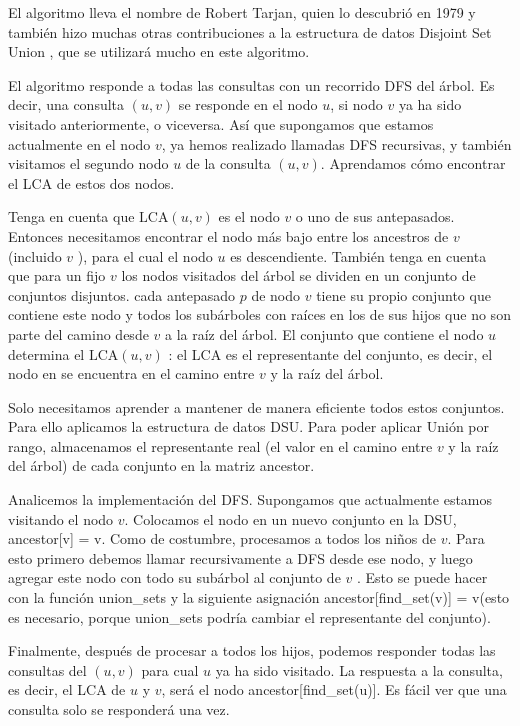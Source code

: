 El algoritmo lleva el nombre de Robert Tarjan, quien lo descubrió en 1979 y también hizo muchas otras contribuciones a la estructura de datos Disjoint Set Union , que se utilizará mucho en este algoritmo. 

El algoritmo responde a todas las consultas con un recorrido DFS del árbol. Es decir, una consulta $(u,v)$ se responde en el nodo $u$, si nodo $v$ ya ha sido visitado anteriormente, o viceversa. Así que supongamos 
que estamos actualmente en el nodo $v$, ya hemos realizado llamadas DFS recursivas, y también visitamos el 
segundo nodo $u$ de la consulta $(u,v)$. Aprendamos cómo encontrar el LCA de estos dos nodos.

Tenga en cuenta que $\text{LCA}(u, v)$ es el nodo $v$ o uno de sus antepasados. Entonces necesitamos 
encontrar el nodo más bajo entre los ancestros de $v$ (incluido $v$ ), para el cual el nodo $u$ es 
descendiente. También tenga en cuenta que para un fijo $v$ los nodos visitados del árbol se dividen en un 
conjunto de conjuntos disjuntos. cada antepasado $p$ de nodo $v$ tiene su propio conjunto que contiene este 
nodo y todos los subárboles con raíces en los de sus hijos que no son parte del camino desde $v$ a la raíz 
del árbol. El conjunto que contiene el nodo $u$ determina el $\text{LCA}(u,v)$ : el LCA es el 
representante del conjunto, es decir, el nodo en se encuentra en el camino entre $v$ y la raíz del árbol.

Solo necesitamos aprender a mantener de manera eficiente todos estos conjuntos. Para ello aplicamos la estructura de datos DSU. Para poder aplicar Unión por rango, almacenamos el representante real (el valor en el camino entre $v$ y la raíz del árbol) de cada conjunto en la matriz ancestor.

Analicemos la implementación del DFS. Supongamos que actualmente estamos visitando el nodo $v$. Colocamos el nodo en un nuevo conjunto en la DSU, ancestor[v] = v. Como de costumbre, procesamos a todos los niños de $v$. Para esto primero debemos llamar recursivamente a DFS desde ese nodo, y luego agregar este nodo con todo su subárbol al conjunto de $v$ . Esto se puede hacer con la función union\_sets y la siguiente asignación ancestor[find\_set(v)] = v(esto es necesario, porque union\_sets podría cambiar el representante del conjunto).

Finalmente, después de procesar a todos los hijos, podemos responder todas las consultas del $(u,v)$ para cual $u$ ya ha sido visitado. La respuesta a la consulta, es decir, el LCA de $u$ y $v$, será el nodo ancestor[find\_set(u)]. Es fácil ver que una consulta solo se responderá una vez.

